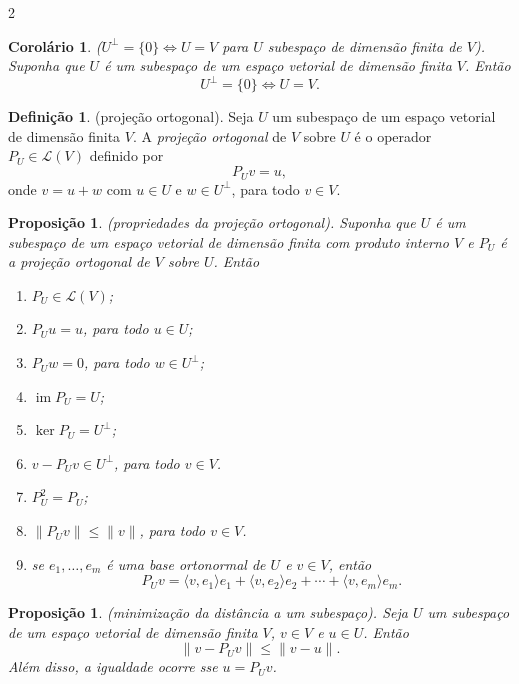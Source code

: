 \documentclass{article}
\theoremstyle{plain}
\newtheorem{prop}[thm]{Proposição}
\newtheorem{cor}[thm]{Corolário}
\theoremstyle{definition}
\newtheorem{defn}{Definição}[section]
\theoremstyle{remark}
\DeclareMathOperator{\im}{im}
\begin{document}
\begin{multicols}{2}
\begin{cor} (\(U^\perp = \{0\} \iff U = V\) para \(U\) subespaço de dimensão finita de \(V\)).
    Suponha que \(U\) é um subespaço de um espaço vetorial de dimensão finita \(V\). Então 
    \[
        U^\perp = \{0\} \iff U = V.
    \]
\end{cor}

\begin{defn} (projeção ortogonal).
    Seja \(U\) um subespaço de um espaço vetorial de dimensão finita \(V\). A \emph{projeção ortogonal} de \(V\) sobre \(U\) é o operador \(P_U \in \mathcal{L}(V)\) definido por 
    \[
        P_U v = u,
    \]
    \noindent onde \(v = u + w\) com \(u \in U\) e \(w \in U^\perp\), para todo \(v \in V\).
\end{defn}

\begin{prop} (propriedades da projeção ortogonal).
    Suponha que \(U\) é um subespaço de um espaço vetorial de dimensão finita com produto interno \(V\) e \(P_U\) é a projeção ortogonal de \(V\) sobre \(U\). Então
    \begin{enumerate}
        \item [\textup{(a)}] \(P_U \in \mathcal{L}(V)\);
        \item [\textup{(b)}] \(P_U u = u\), para todo \(u \in U\);
        \item [\textup{(c)}] \(P_U w = 0\), para todo \(w \in U^\perp\);
        \item [\textup{(d)}] \(\im P_U = U\);
        \item [\textup{(e)}] \(\ker P_U = U^\perp\);
        \item [\textup{(f)}] \(v - P_U v \in U^\perp\), para todo \(v \in V\).
        \item [\textup{(g)}] \(P_U^2 = P_U\);
        \item [\textup{(h)}] \(\|P_U v\| \leq \|v\|\), para todo \(v \in V\).
        \item [\textup{(i)}] se \(e_1, \ldots, e_m\) é uma base ortonormal de \(U\) e \(v \in V\), então
        \[
            P_U v = \langle v, e_1 \rangle e_1 + \langle v, e_2 \rangle e_2 + \cdots + \langle v, e_m \rangle e_m.
        \]
    \end{enumerate}
\end{prop}

\begin{prop} (minimização da distância a um subespaço).
    Seja \(U\) um subespaço de um espaço vetorial de dimensão finita \(V\), \(v \in V\) e \(u \in U\). Então 
    \begin{equation}
        \| v - P_U v \| \leq \| v - u \|.
    \end{equation}
    Além disso, a igualdade ocorre sse \(u = P_U v\).
\end{prop}


\end{multicols}
\end{document}
